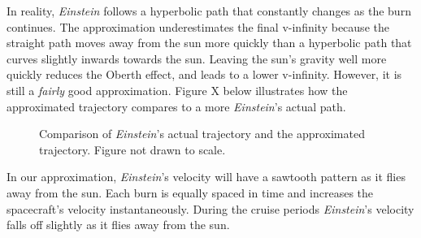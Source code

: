 \documentclass[12pt]{article} %
\begin{document}
In reality, \textit{Einstein} follows a hyperbolic path that constantly changes as the burn continues. The approximation underestimates the final v-infinity because the straight path moves away from the sun more quickly than a hyperbolic path that curves slightly inwards towards the sun. Leaving the sun's gravity well more quickly reduces the Oberth effect, and leads to a lower v-infinity. However, it is still a \textit{fairly} good approximation. Figure X below illustrates how the approximated trajectory compares to a more \textit{Einstein}'s actual path.

\begin{figure}[H]
	\caption{Comparison of \textit{Einstein}'s actual trajectory and the approximated trajectory. Figure not drawn to scale.}
\end{figure}

In our approximation, \textit{Einstein}'s velocity will have a sawtooth pattern as it flies away from the sun. Each burn is equally spaced in time and increases the spacecraft's velocity instantaneously. During the cruise periods \textit{Einstein}'s velocity falls off slightly as it flies away from the sun.
\end{document}
